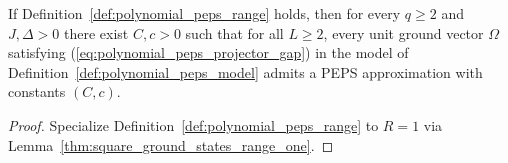 \begin{lemma}
    \label{thm:polynomial_peps_of_range}
    \leanok
    If Definition~\ref{def:polynomial_peps_range} holds, then for every $q\ge2$ and $J,\Delta>0$ there exist $C,c>0$ such that for all $L\ge2$, every unit ground vector $\Omega$ satisfying (\ref{eq:polynomial_peps_projector_gap}) in the model of Definition~\ref{def:polynomial_peps_model} admits a PEPS approximation with constants $(C,c)$.
\end{lemma}
\begin{proof}
    \leanok
    Specialize Definition~\ref{def:polynomial_peps_range} to $R=1$ via Lemma~\ref{thm:square_ground_states_range_one}.
\end{proof}

